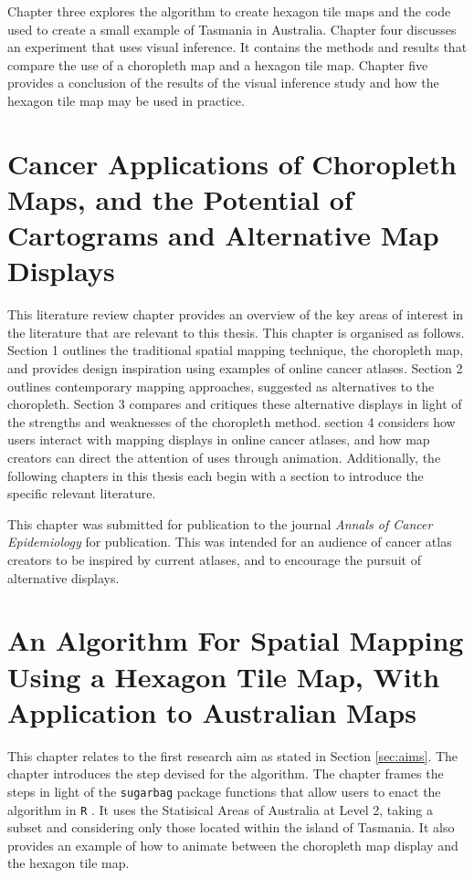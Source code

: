 \documentclass{monashthesis}
\begin{document}
Chapter three explores the algorithm to create hexagon tile maps and the code used to create a small example of Tasmania in Australia.
Chapter four discusses an experiment that uses visual inference. It contains the methods and results that compare the use of a choropleth map and a hexagon tile map.
Chapter five provides a conclusion of the results of the visual inference study and how the hexagon tile map may be used in practice.

\hypertarget{ch:literature}{%
\chapter{Cancer Applications of Choropleth Maps, and the Potential of Cartograms and Alternative Map Displays}\label{ch:literature}}

This literature review chapter provides an overview of the key areas of interest in the literature that are relevant to this thesis. This chapter is organised as follows. Section 1 outlines the traditional spatial mapping technique, the choropleth map, and provides design inspiration using examples of online cancer atlases. Section 2 outlines contemporary mapping approaches, suggested as alternatives to the choropleth. Section 3 compares and critiques these alternative displays in light of the strengths and weaknesses of the choropleth method. section 4 considers how users interact with mapping displays in online cancer atlases, and how map creators can direct the attention of uses through animation. Additionally, the following chapters in this thesis each begin with a section to introduce the specific relevant literature.

This chapter was submitted for publication to the journal \emph{Annals of Cancer Epidemiology} for publication. This was intended for an audience of cancer atlas creators to be inspired by current atlases, and to encourage the pursuit of alternative displays.





\hypertarget{ch:algorithm}{%
\chapter{An Algorithm For Spatial Mapping Using a Hexagon Tile Map, With Application to Australian Maps}\label{ch:algorithm}}

This chapter relates to the first research aim as stated in Section \ref{sec:aims}.
The chapter introduces the step devised for the algorithm.
The chapter frames the steps in light of the \texttt{sugarbag} \autocite{sugarbag} package functions that allow users to enact the algorithm in \texttt{R} \autocite{R}. It uses the Statisical Areas of Australia at Level 2, taking a subset and considering only those located within the island of Tasmania.
It also provides an example of how to animate between the choropleth map display and the hexagon tile map.
\end{document}
